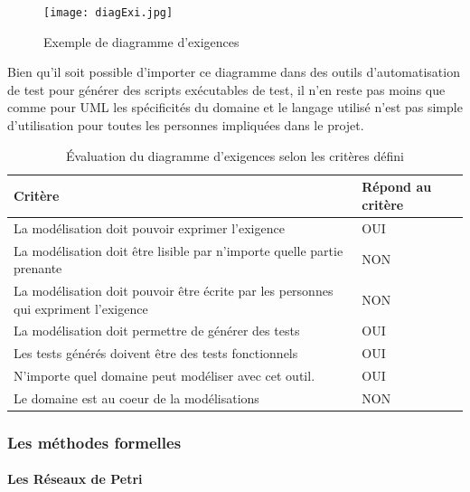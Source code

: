          \begin{figure}[H]
            \centering
            \texttt{[image: diagExi.jpg]}
            \caption{Exemple de diagramme d'exigences~\cite{diagExi}}
        \end{figure}
    
        Bien qu'il soit possible d'importer ce diagramme dans des outils d'automatisation de test pour générer des scripts exécutables de test, il n'en reste pas moins que comme pour UML les spécificités du domaine et le langage utilisé n'est pas simple d'utilisation pour toutes les personnes impliquées dans le projet.
    
        \begin{table}[H]
        \centering
         \begin{tabular}{|p{25em}|p{5em}|} 
         \hline
        Critère & Répond au critère \\ [0.5ex] 
         \hline
         La modélisation doit pouvoir exprimer l’exigence & \cellcolor[HTML]{699A73}OUI\\
         \hline
        La modélisation doit être lisible par n’importe quelle partie prenante & \cellcolor[HTML]{D03737}NON\\
         \hline
        La modélisation doit pouvoir être écrite par les personnes qui expriment l’exigence &\cellcolor[HTML]{D03737} NON \\
         \hline
        La modélisation doit permettre de générer des tests & \cellcolor[HTML]{699A73}OUI \\
         \hline
        Les tests générés doivent être des tests fonctionnels &\cellcolor[HTML]{699A73} OUI\\ 
         \hline
        N’importe quel domaine peut modéliser avec cet outil.&\cellcolor[HTML]{699A73} OUI\\ 
         \hline
        Le domaine est au coeur de la modélisations &\cellcolor[HTML]{D03737} NON\\ 
        \hline 
        \end{tabular}
        \caption{Évaluation du diagramme d'exigences selon les critères défini}
        \end{table}
        
        \subsubsection{Les méthodes formelles}
        
        \paragraph{Les Réseaux de Petri}
        
